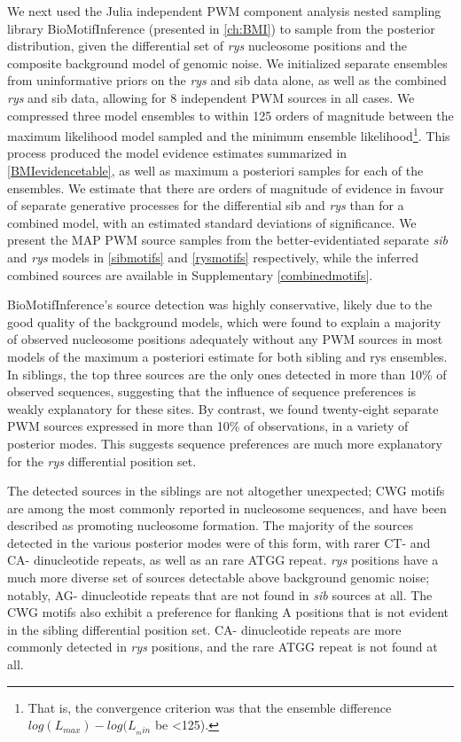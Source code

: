 We next used the Julia independent PWM component analysis nested sampling library BioMotifInference (presented in \autoref{ch:BMI}) to sample from the posterior distribution, given the differential set of \textit{rys} nucleosome positions and the composite background model of genomic noise. We initialized separate ensembles from uninformative priors on the \textit{rys} and sib data alone, as well as the combined \textit{rys} and sib data, allowing for 8 independent PWM sources in all cases. We compressed three model ensembles to within 125 orders of magnitude between the maximum likelihood model sampled and the minimum ensemble likelihood\footnote{That is, the convergence criterion was that the ensemble difference $log(L_{max})-log(L_{_min}$ be <125).}. This process produced the model evidence estimates summarized in \autoref{BMIevidencetable}, as well as maximum a posteriori samples for each of the ensembles. We estimate that there are orders of magnitude of evidence in favour of separate generative processes for the differential sib and \textit{rys} than for a combined model, with an estimated standard deviations of significance. We present the MAP PWM source samples from the better-evidentiated separate \textit{sib} and \textit{rys} models in \autoref{sibmotifs} and \autoref{rysmotifs} respectively, while the inferred combined sources are available in Supplementary \autoref{combinedmotifs}.

BioMotifInference's source detection was highly conservative, likely due to the good quality of the background models, which were found to explain a majority of observed nucleosome positions adequately without any PWM sources in most models of the maximum a posteriori estimate for both sibling and rys ensembles. In siblings, the top three sources are the only ones detected in more than 10\% of observed sequences, suggesting that the influence of sequence preferences is weakly explanatory for these sites. By contrast, we found twenty-eight separate PWM sources expressed in more than 10\% of observations, in a variety of posterior modes. This suggests sequence preferences are much more explanatory for the \textit{rys} differential position set.

The detected sources in the siblings are not altogether unexpected; CWG motifs are among the most commonly reported in nucleosome sequences, and have been described as promoting nucleosome formation. The majority of the sources detected in the various posterior modes were of this form, with rarer CT- and CA- dinucleotide repeats, as well as an rare ATGG repeat. \textit{rys} positions have a much more diverse set of sources detectable above background genomic noise; notably, AG- dinucleotide repeats that are not found in \textit{sib} sources at all. The CWG motifs also exhibit a preference for flanking A positions that is not evident in the sibling differential position set. CA- dinucleotide repeats are more commonly detected in \textit{rys} positions, and the rare ATGG repeat is not found at all.

